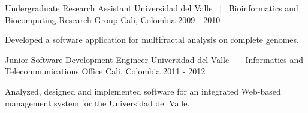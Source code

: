 \vspace{\acvSectionContentTopSkip}
\cventry
{Undergraduate Research Assistant} %
{Universidad del Valle {\normalfont ~|~ Bioinformatics and Biocomputing Research Group}} %
{Cali, Colombia} %
{2009 - 2010} %
{ %
\begin{cvitems}
\item {Developed a software application for multifractal analysis on complete genomes.}
\end{cvitems}
}


\begin{cventries}
\cventry
{Junior Software Development Engineer} %
{Universidad del Valle {\normalfont ~|~ Informatics and Telecommunications Office}} %
{Cali, Colombia} %
{2011 - 2012} %
{ %
\begin{cvitems}
\item {Analyzed, designed and implemented software for an integrated Web-based management system for the Universidad del Valle.}
\end{cvitems}
}
\end{cventries}


